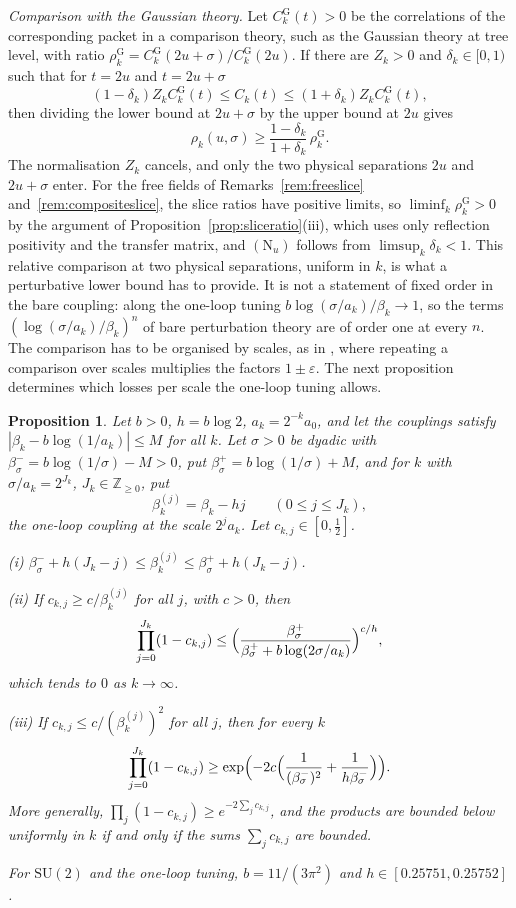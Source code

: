 \documentclass[aps,prd,twocolumn,superscriptaddress,nofootinbib,longbibliography,floatfix,amsmath,amssymb,10pt]{revtex4-2}
\newtheorem{proposition}[theorem]{Proposition}
\theoremstyle{definition}
\theoremstyle{remark}
\newcommand{\Z}{\mathbb{Z}}
\newcommand{\SU}{\mathrm{SU}}
\begin{document}
\emph{Comparison with the Gaussian theory.} Let $C^{\mathrm G}_k(t)>0$ be the
correlations of the corresponding packet in a comparison theory, such as the
Gaussian theory at tree level, with ratio
$\rho^{\mathrm G}_k=C^{\mathrm G}_k(2u+\sigma)/C^{\mathrm G}_k(2u)$. If there
are $Z_k>0$ and $\delta_k\in[0,1)$ such that for $t=2u$ and $t=2u+\sigma$
\[
(1-\delta_k)Z_kC^{\mathrm G}_k(t)\le C_k(t)\le(1+\delta_k)Z_kC^{\mathrm
G}_k(t),
\]
then dividing the lower bound at $2u+\sigma$ by the upper bound at $2u$ gives
\[
\rho_k(u,\sigma)\ge\frac{1-\delta_k}{1+\delta_k}\,\rho^{\mathrm G}_k .
\]
The normalisation $Z_k$ cancels, and only the two physical separations $2u$
and $2u+\sigma$ enter. For the free fields of Remarks~\ref{rem:freeslice}
and~\ref{rem:compositeslice}, the slice ratios have positive limits, so
$\liminf_k\rho^{\mathrm G}_k>0$ by the argument of
Proposition~\ref{prop:sliceratio}(iii), which uses only reflection positivity
and the transfer matrix,
and $(\mathrm N_u)$ follows from $\limsup_k\delta_k<1$. This relative
comparison at two physical separations, uniform in $k$, is what a
perturbative lower bound has to provide. It is not a statement of fixed order
in the bare coupling: along the one-loop tuning $b\log(\sigma/a_k)/\beta_k\to
1$, so the terms $(\log(\sigma/a_k)/\beta_k)^n$ of bare perturbation theory
are of order one at every $n$. The comparison has to be organised by
scales, as in \cite[Proposition~460]{BBLR26}, where repeating a
comparison over scales multiplies the factors $1\pm\varepsilon$. The next
proposition determines which losses per scale the one-loop tuning allows.

\begin{proposition}\label{prop:scalelosses}
Let $b>0$, $h=b\log2$, $a_k=2^{-k}a_0$, and let the couplings satisfy
$|\beta_k-b\log(1/a_k)|\le M$ for all $k$. Let $\sigma>0$ be dyadic with
$\beta^-_\sigma=b\log(1/\sigma)-M>0$, put $\beta^+_\sigma=b\log(1/\sigma)+M$,
and for $k$ with $\sigma/a_k=2^{J_k}$, $J_k\in\Z_{\ge0}$, put
\[
\beta^{(j)}_k=\beta_k-hj\qquad(0\le j\le J_k),
\]
the one-loop coupling at the scale $2^ja_k$. Let $c_{k,j}\in[0,\frac12]$.

\textup{(i)} $\beta^-_\sigma+h(J_k-j)\le\beta^{(j)}_k\le\beta^+_\sigma+
h(J_k-j)$.

\textup{(ii)} If $c_{k,j}\ge c/\beta^{(j)}_k$ for all $j$, with $c>0$, then
\[
\prod_{j=0}^{J_k}(1-c_{k,j})\le\Bigl(\frac{\beta^+_\sigma}{\beta^+_\sigma+
b\log(2\sigma/a_k)}\Bigr)^{c/h},
\]
which tends to $0$ as $k\to\infty$.

\textup{(iii)} If $c_{k,j}\le c/(\beta^{(j)}_k)^2$ for all $j$, then for
every $k$
\[
\prod_{j=0}^{J_k}(1-c_{k,j})\ge\exp\Bigl(-2c\Bigl(\frac1{(\beta^-_\sigma)^2}
+\frac1{h\beta^-_\sigma}\Bigr)\Bigr).
\]
More generally, $\prod_j(1-c_{k,j})\ge e^{-2\sum_jc_{k,j}}$, and the
products are bounded below uniformly in $k$ if and only if the sums
$\sum_jc_{k,j}$ are bounded.

For $\SU(2)$ and the one-loop tuning, $b=11/(3\pi^2)$ and
$h\in[0.25751,0.25752]$.
\end{proposition}
\end{document}
